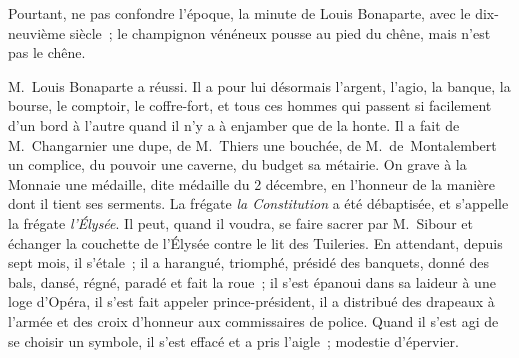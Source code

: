 \documentclass[french,twoside]{book} %
\begin{document}
Pourtant, ne pas confondre l’époque, la minute de Louis Bonaparte, avec le dix-neuvième siècle ; le champignon vénéneux pousse au pied du chêne, mais n’est pas le chêne.\par
M. Louis Bonaparte a réussi. Il a pour lui désormais l’argent, l’agio, la banque, la bourse, le comptoir, le coffre-fort, et tous ces hommes qui passent si facilement d’un bord à l’autre quand il n’y a à enjamber que de la honte. Il a fait de M. Changarnier une dupe, de M. Thiers une bouchée, de M. de Montalembert un complice, du pouvoir une caverne, du budget sa métairie. On grave à la Monnaie une médaille, dite médaille du 2 décembre, en l’honneur de la manière dont il tient ses serments. La frégate \emph{la Constitution} a été débaptisée, et s’appelle la frégate \emph{l’Élysée}. Il peut, quand il voudra, se faire sacrer par M. Sibour et échanger la couchette de l’Élysée contre le lit des Tuileries. En attendant, depuis sept mois, il s’étale ; il a harangué, triomphé, présidé des banquets, donné des bals, dansé, régné, paradé et fait la roue ; il s’est épanoui dans sa laideur à une loge d’Opéra, il s’est fait appeler prince-président, il a distribué des drapeaux à l’armée et des croix d’honneur aux commissaires de police. Quand il s’est agi de se choisir un symbole, il s’est effacé et a pris l’aigle ; modestie d’épervier.
\end{document}
